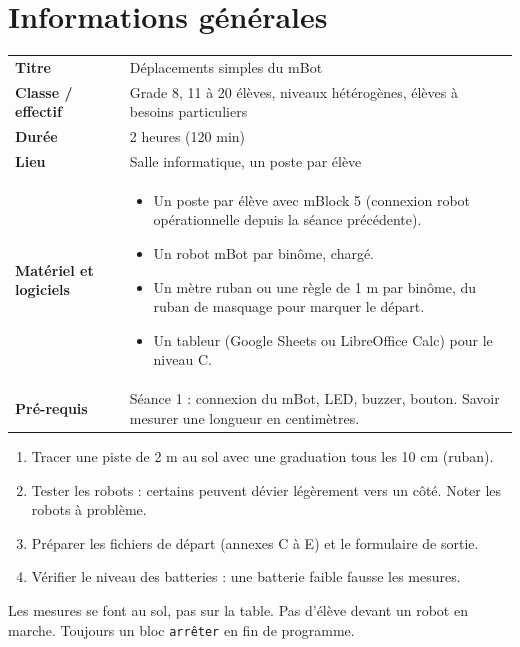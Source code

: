 \documentclass[11pt,a4paper]{article}
\begin{document}

\section{Informations générales}
\begin{tabularx}{\linewidth}{>{\bfseries}p{3.6cm}Y}
\toprule
Titre & Déplacements simples du mBot\\
Classe / effectif & Grade 8, 11 à 20 élèves, niveaux hétérogènes, élèves à besoins particuliers\\
Durée & 2 heures (120 min)\\
Lieu & Salle informatique, un poste par élève\\
Matériel et logiciels &
\begin{itemize}
 \item Un poste par élève avec mBlock 5 (connexion robot opérationnelle depuis la séance précédente).
 \item Un robot mBot par binôme, chargé.
 \item Un mètre ruban ou une règle de 1 m par binôme, du ruban de masquage pour marquer le départ.
 \item Un tableur (Google Sheets ou LibreOffice Calc) pour le niveau C.
\end{itemize}\\
Pré-requis &
Séance 1 : connexion du mBot, LED, buzzer, bouton. Savoir mesurer une longueur en centimètres.\\
\bottomrule
\end{tabularx}

\begin{astuce}
\begin{enumerate}
 \item Tracer une piste de 2 m au sol avec une graduation tous les 10 cm (ruban).
 \item Tester les robots : certains peuvent dévier légèrement vers un côté. Noter les robots à problème.
 \item Préparer les fichiers de départ (annexes C à E) et le formulaire de sortie.
 \item Vérifier le niveau des batteries : une batterie faible fausse les mesures.
\end{enumerate}
\end{astuce}

\begin{astuce}[Sécurité]
Les mesures se font au sol, pas sur la table. Pas d'élève devant un robot en marche. Toujours un bloc \texttt{arrêter} en fin de programme.
\end{astuce}
\end{document}
